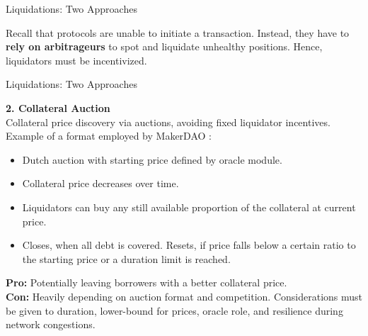 \documentclass[handout]{beamer}
\begin{document}
\begin{frame}{Liquidations: Two Approaches}

Recall that protocols are unable to initiate a transaction. Instead, they have to \textbf{rely on arbitrageurs} to spot and liquidate unhealthy positions. Hence, liquidators must be incentivized. 



\end{frame}


\begin{frame}{Liquidations: Two Approaches }


\textbf{2. Collateral Auction}\\
\vspace{0.2em}
Collateral price discovery via auctions, avoiding fixed liquidator incentives. Example of a format employed by MakerDAO \cite{MakerDAO}:
\begin{itemize}
\item Dutch auction with starting price defined by oracle module. 
\item Collateral price decreases over time. 
\item Liquidators can buy any still available proportion of the collateral at current price.
\item Closes, when all debt is covered. Resets, if price falls below a certain ratio to the starting price or a duration limit is reached.
\end{itemize}
\vspace{0.5em}

\textbf{Pro:} Potentially leaving borrowers with a better collateral price.\\
\vspace{0.5em}
\textbf{Con:} Heavily depending on auction format and competition. Considerations must be given to duration, lower-bound for  prices, oracle role, and resilience during network congestions.

\end{frame}
\end{document}
